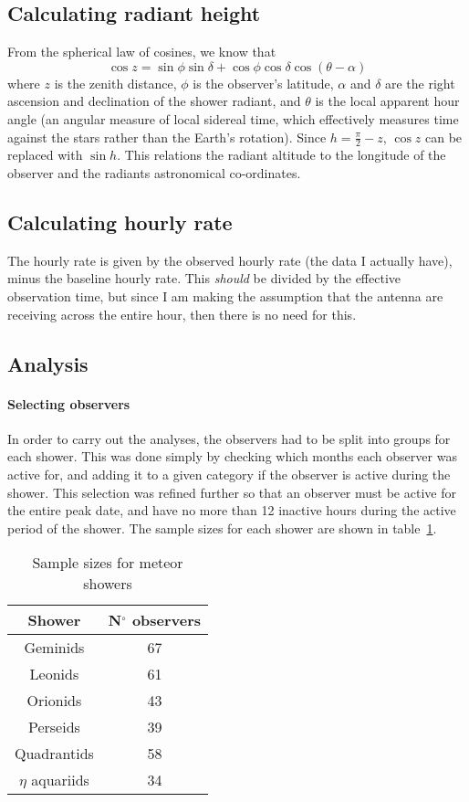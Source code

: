 \subsection{Calculating radiant height}
From the spherical law of cosines, we know that 
\[ \cos z =  \sin \phi \sin \delta + \cos \phi \cos \delta \cos \left(\theta - \alpha\right)\]
where $z$ is the zenith distance, $\phi$ is the observer's latitude, $\alpha$ and $\delta$ are the right ascension and declination of the shower radiant, and $\theta$ is the local apparent hour angle (an angular measure of local sidereal time, which effectively measures time against the stars rather than the Earth's rotation). Since $h = \frac{\pi}{2} - z$, $\cos z$ can be replaced with $\sin h$. This relations the radiant altitude to the longitude of the observer and the radiants astronomical co-ordinates.
\subsection{Calculating hourly rate}
The hourly rate is given by the observed hourly rate (the data I actually have), minus the baseline hourly rate. This \textit{should} be divided by the effective observation time, but since I am making the assumption that the antenna are receiving across the entire hour, then there is no need for this.
\subsection{Analysis}
\paragraph{Selecting observers}
In order to carry out the analyses, the observers had to be split into groups for each shower. This was done simply by checking which months each observer was active for, and adding it to a given category if the observer is active during the shower. This selection was refined further so that an observer must be active for the entire peak date, and have no more than 12 inactive hours during the active period of the shower. The sample sizes for each shower are shown in table~\ref{tab:zhr:sizes}.
\begin{table}
	\centering
	\begin{tabular}{cc}
		\hline
		Shower & N$^{\circ}$ observers \\
		\hline
		Geminids & 67 \\
		Leonids & 61 \\
		Orionids & 43 \\
		Perseids & 39 \\
		Quadrantids & 58 \\
		$\eta$ aquariids & 34 \\
		\hline
	\end{tabular}
	\caption{Sample sizes for meteor showers
		\label{tab:zhr:sizes}}
\end{table}
